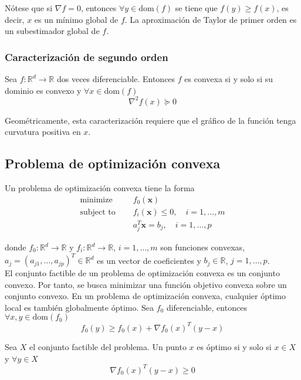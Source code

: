 Nótese que si $\nabla f = 0$, entonces $\forall y \in \text{dom}(f)$ se tiene que $f(y) \geq f(x)$, es decir, $x$ es un mínimo global de $f$. La aproximación de Taylor de primer orden es un subestimador global de $f$.

\subsubsection{Caracterización de segundo orden}
Sea $f: \mathbb{R}^d \to \mathbb{R}$ dos veces diferenciable. Entonces $f$ es convexa si y solo si su dominio es convexo y $\forall x \in \text{dom}(f)$
\begin{equation}
\nabla^2 f(x) \succeq 0
\end{equation}

Geométricamente, esta caracterización requiere que el gráfico de la función tenga curvatura positiva en $x$.

\subsection{Problema de optimización convexa}

\noindent Un problema de optimización convexa tiene la forma 
\begin{align}
\text{minimize } \quad & f_0(\mathbf{x}) \\
\text{subject to } \quad & f_i(\mathbf{x}) \leq 0, \quad i = 1, \ldots, m \\
& a_j^T\mathbf{x} = b_j, \quad i = 1, \ldots, p 
\end{align}

\noindent donde $f_0: \mathbb{R}^d \to \mathbb{R}$ y $f_i: \mathbb{R}^d \to \mathbb{R}$, $i = 1, \dots, m$ son funciones convexas, $a_j = (a_{j1}, \dots, a_{jp})^T \in \mathbb{R}^d$ es un vector de coeficientes y $b_j \in \mathbb{R}$, $j = 1, \dots, p$. \\

El conjunto factible de un problema de optimización convexa es un conjunto convexo. Por tanto, se busca minimizar una función objetivo convexa sobre un conjunto convexo. En un problema de optimización convexa, cualquier óptimo local es también globalmente óptimo. Sea $f_0$ diferenciable, entonces $\forall x, y \in \text{dom}(f_0)$
\begin{equation}
f_0(y) \geq f_0(x) + \nabla f_0(x)^T(y - x)
\end{equation}

\noindent Sea $X$ el conjunto factible del problema. Un punto $x$ es óptimo si y solo si $x \in X$ y $\forall y \in X$
\begin{equation}
\nabla f_0(x)^T(y - x) \geq 0
\end{equation}

